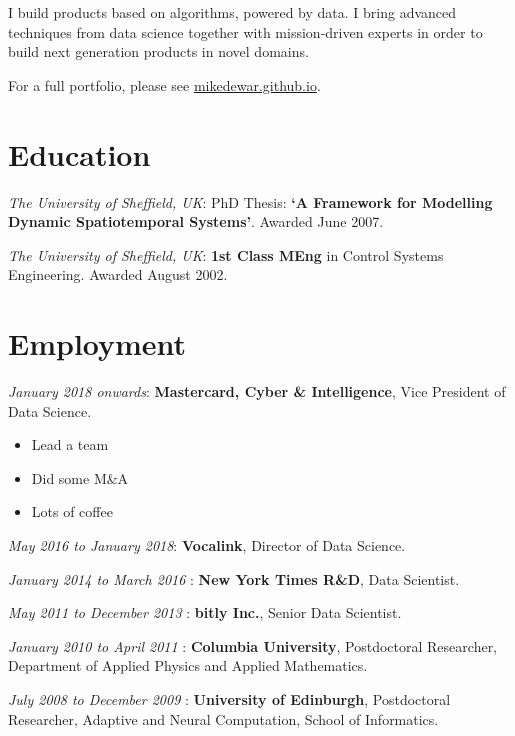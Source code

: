 \documentclass[line, overlapped]{res}
\begin{document}

\address{
London\\
mikedewar@gmail.com
}

\begin{resume}

I build products based on algorithms, powered by data. I bring advanced
techniques from data science together with mission-driven experts in
order to build next generation products in novel domains.

For a full portfolio, please see \href{https://mikedewar.github.io}{mikedewar.github.io}.

\section{Education}

\emph{The University of Sheffield, UK}: PhD Thesis: \textbf{`A
  Framework for Modelling Dynamic Spatiotemporal Systems'}. Awarded June
  2007. 

\emph{The University of Sheffield, UK}: \textbf{1st Class MEng} in
  Control Systems Engineering. Awarded August 2002.

\section{Employment}

  \emph{January 2018 onwards}: \textbf{Mastercard, Cyber \&
  Intelligence}, Vice President of Data Science.
  \begin{itemize}
	\item Lead a team
	\item Did some M\&A
	\item Lots of coffee
  \end{itemize}

  \emph{May 2016 to January 2018}: \textbf{Vocalink}, Director of Data
  Science.

  \emph{January 2014 to March 2016} : \textbf{New York Times R\&D}, Data
  Scientist.

  \emph{May 2011 to December 2013} : \textbf{bitly Inc.}, Senior Data
  Scientist.

  \emph{January 2010 to April 2011} : \textbf{Columbia University},
  Postdoctoral Researcher, Department of Applied Physics and Applied
  Mathematics.

  \emph{July 2008 to December 2009} : \textbf{University of Edinburgh},
  Postdoctoral Researcher, Adaptive and Neural Computation, School of
  Informatics.


\end{resume}
\end{document}
